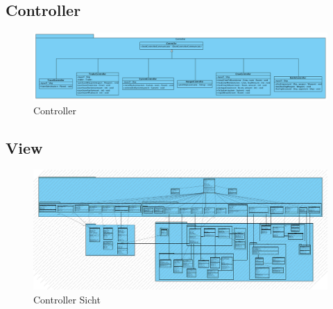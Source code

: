 \documentclass[fontsize=12pt,paper=a4,twoside]{scrartcl}
\begin{document}
\subsection{Controller}
\begin{figure}[H]
\begin{center}
  \includegraphics[width=\linewidth]{../GT_Modulsicht/src/Controllersicht.png}
    \caption{Controller}
\end{center}
\end{figure}

\subsection{View}
\begin{figure} 
\begin{center}
 \includegraphics[width=\textwidth]{../GT_Modulsicht/src/View (2).pdf}
  \caption{Controller Sicht}
  \label{fig:boat1}
\end{center}
\end{figure}
\end{document}
